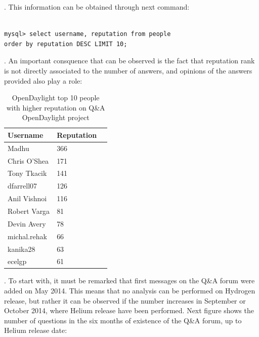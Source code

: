 \documentclass[a4paper, 12pt]{book}
\begin{document}
{. This information can be obtained through next command:

\begin{verbatim}

mysql> select username, reputation from people
order by reputation DESC LIMIT 10;

\end{verbatim}

. An important consquence that can be observed is the fact that reputation rank is not directly associated to the number of answers, and opinions of the answers provided also play a role:
\begin{table}[H]
\footnotesize
\begin{center}
\begin{tabular}{|l|l|p{3cm}|}
\hline
\textbf{Username} & \textbf{Reputation} \\ \hline
 Madhu & 366 \\ \hline
 Chris O'Shea & 171 \\ \hline
 Tony Tkacik & 141 \\ \hline
 dfarrell07 & 126 \\ \hline
 Anil Vishnoi & 116 \\ \hline
 Robert Varga & 81 \\ \hline
 Devin Avery & 78 \\ \hline
 michal.rehak & 66 \\ \hline
 kanika28 & 63 \\ \hline
 ecelgp & 61 \\ \hline
\end{tabular}
\end{center}
\caption{OpenDaylight top 10 people with higher reputation on Q\&A OpenDaylight project}
\label{tab:odl_top_people_reputation}
\end{table}
. To start with, it must be remarked that first messages on the Q\&A forum were added on May 2014. This means that no analysis can be performed on Hydrogen release, but rather it can be observed if the number increases in September or October 2014, where Helium release have been performed. Next figure shows the number of questions in the six months of existence of the Q\&A forum, up to Helium release date:
}
\end{document}
